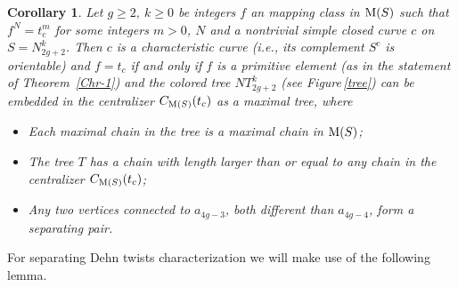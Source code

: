 \documentclass[11 pt]{amsart}
\newtheorem{Corollary}[Theorem]{Corollary}
\theoremstyle{definition}
\begin{document}
\begin{Corollary}\label{Cor-CompOrient}
Let $g\geq 2, \ k\geq 0$ be integers $f$ an mapping class in ${\rm
M}(S)$ such that $f^N=t_c^m$ for some integers $m>0$, $N$ and a
nontrivial simple closed curve $c$ on $S=N_{2g+2}^k$. Then $c$ is a
characteristic curve (i.e., its complement $S^c$ is orientable) and
$f=t_c$ if and only if $f$ is a primitive element (as in the
statement of Theorem~\ref{Chr-1}) and the colored tree $NT_{2g+2}^k$
(see Figure\,\ref{tree}) can be embedded in the centralizer $C_{{\rm
M}(S)}(t_c)$ as a maximal tree, where
\begin{itemize}
\item[1)] Each maximal chain in the tree is a maximal chain in ${\rm M}(S)$;

\item[2)] The tree $T$ has a chain with length larger than or equal to any
chain in the centralizer $C_{{\rm M}(S)}(t_c)$;

\item[3)] Any two vertices connected to $a_{4g-3}$, both different than
$a_{4g-4}$, form a separating pair.
\end{itemize}

\end{Corollary}

\bigskip
\noindent

For separating Dehn twists characterization we will make use of the
following lemma.
\end{document}
